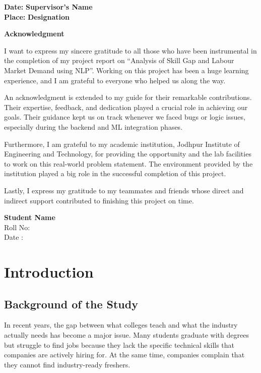 \documentclass[12pt,a4paper]{report}
\begin{document}
\begin{flushleft}
\textbf{Date:} \hfill \textbf{Supervisor's Name} \\
\textbf{Place:} \hfill \textbf{Designation}
\end{flushleft}

\newpage
\thispagestyle{empty}
\begin{center}
    \vspace*{2cm}
    \Huge{\textbf{Acknowledgment}}
\end{center}
\vspace{1cm}
\large
I want to express my sincere gratitude to all those who have been instrumental in the completion of my project report on ``Analysis of Skill Gap and Labour Market Demand using NLP''. Working on this project has been a huge learning experience, and I am grateful to everyone who helped us along the way.

An acknowledgment is extended to my guide for their remarkable contributions. Their expertise, feedback, and dedication played a crucial role in achieving our goals. Their guidance kept us on track whenever we faced bugs or logic issues, especially during the backend and ML integration phases.

Furthermore, I am grateful to my academic institution, Jodhpur Institute of Engineering and Technology, for providing the opportunity and the lab facilities to work on this real-world problem statement. The environment provided by the institution played a big role in the successful completion of this project.

Lastly, I express my gratitude to my teammates and friends whose direct and indirect support contributed to finishing this project on time.

\vspace{2cm}
\begin{flushleft}
\textbf{Student Name} \\
Roll No: \\
Date :
\end{flushleft}

\newpage
\tableofcontents

\chapter{Introduction}

\section{Background of the Study}
In recent years, the gap between what colleges teach and what the industry actually needs has become a major issue. Many students graduate with degrees but struggle to find jobs because they lack the specific technical skills that companies are actively hiring for. At the same time, companies complain that they cannot find industry-ready freshers. 
\end{document}
